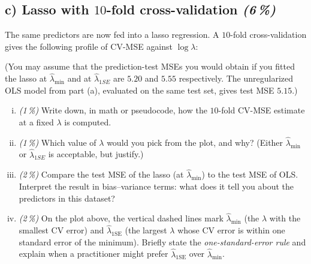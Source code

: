 \documentclass[11pt,a4paper]{article}
\newcommand{\subpoints}[1]{\textit{(#1\,\%)}}
\begin{document}
\subsection*{c) Lasso with $10$-fold cross-validation \subpoints{6}}
The same predictors are now fed into a lasso regression. A $10$-fold cross-validation gives the following profile of CV-MSE against $\log \lambda$:

\begin{center}
\end{center}

\noindent (You may assume that the prediction-test MSEs you would obtain if you fitted the lasso at $\hat\lambda_{\min}$ and at $\hat\lambda_{1SE}$ are $5.20$ and $5.55$ respectively. The unregularized OLS model from part (a), evaluated on the same test set, gives test MSE $5.15$.)

\begin{enumerate}[(i)]
  \item \subpoints{1} Write down, in math or pseudocode, how the $10$-fold CV-MSE estimate at a fixed $\lambda$ is computed.
  \item \subpoints{1} Which value of $\lambda$ would you pick from the plot, and why? (Either $\hat\lambda_{\min}$ or $\hat\lambda_{1SE}$ is acceptable, but justify.)
  \item \subpoints{2} Compare the test MSE of the lasso (at $\hat\lambda_{\min}$) to the test MSE of OLS. Interpret the result in bias--variance terms: what does it tell you about the predictors in this dataset?
  \item \subpoints{2} On the plot above, the vertical dashed lines mark $\hat\lambda_{\min}$ (the $\lambda$ with the smallest CV error) and $\hat\lambda_{1\text{SE}}$ (the largest $\lambda$ whose CV error is within one standard error of the minimum). Briefly state the \emph{one-standard-error rule} and explain when a practitioner might prefer $\hat\lambda_{1\text{SE}}$ over $\hat\lambda_{\min}$.
\end{enumerate}
\end{document}
